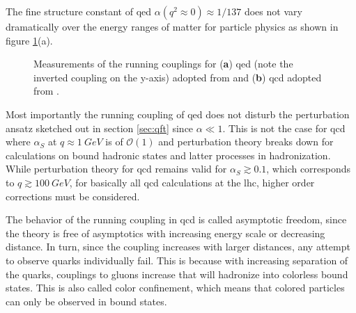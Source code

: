 The fine structure constant of \ac{qed} $\alpha(q^2\approx 0)\approx 1/137$ does not vary dramatically over the energy ranges of matter for particle physics as shown in figure \ref{fig:renorm_scaling_exp}(a).
\begin{figure}
    \centering
    \hspace{5mm}
    \caption[]{Measurements of the running couplings for (\textbf{a}) \ac{qed} (note the inverted coupling on the y-axis) adopted from \citep{opal2004tests} and (\textbf{b}) \ac{qcd} adopted from \citep{particle2022review}.}
    \label{fig:renorm_scaling_exp}
\end{figure}
Most importantly the running coupling of \ac{qed} does not disturb the perturbation ansatz sketched out in section \ref{sec:qft} since $\alpha\ll1$. This is not the case for \ac{qcd} where $\alpha_S$ at $q\approx\qty{1}{GeV}$ is of $\mathcal{O}(1)$ and perturbation theory breaks down for calculations on bound hadronic states and latter processes in hadronization. While perturbation theory for \ac{qcd} remains valid for $\alpha_S\gtrsim  0.1$, which corresponds to $q\gtrsim \qty{100}{GeV}$, for basically all \ac{qcd} calculations at the \ac{lhc}, higher order corrections must be considered.

The behavior of the running coupling in \ac{qcd} is called asymptotic freedom, since the theory is free of asymptotics with increasing energy scale or decreasing distance. In turn, since the coupling increases with larger distances, any attempt to observe quarks individually fail. This is because with increasing separation of the quarks, couplings to gluons increase that will hadronize into colorless bound states. This is also called color confinement, which means that colored particles can only be observed in bound states.

